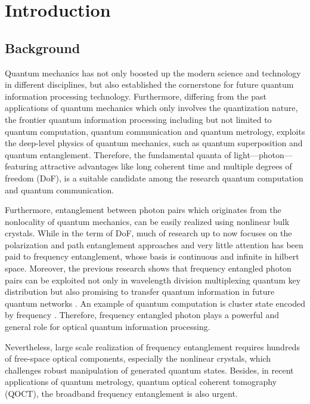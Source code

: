 \chapter{Introduction}

\section{Background}

Quantum mechanics has not only boosted up the modern science and technology in different disciplines, but also established the cornerstone for future quantum information processing technology. 
Furthermore, differing from the past applications of quantum mechanics which only involves the quantization nature, the frontier quantum information processing 
including but not limited to quantum computation, quantum communication and quantum metrology, 
exploits the deep-level physics of quantum mechanics, such as quantum superposition and quantum entanglement.
Therefore, the fundamental quanta of light---photon---featuring attractive advantages like long coherent time and multiple degrees of freedom (DoF), is a suitable candidate among the research quantum computation and quantum communication. 

Furthermore, entanglement between photon pairs which originates from the nonlocality of quantum mechanics, can be easily realized using nonlinear bulk crystals. 
While in the term of DoF, much of research up to now focuses on the polarization and path entanglement approaches and very little attention has been paid to frequency entanglement, whose basis is continuous and infinite in hilbert space. 
Moreover, the previous research shows that frequency entangled photon pairs can be exploited not only in wavelength division multiplexing quantum key distribution \cite{Wengerowsky2018} but also promising to transfer quantum information in future quantum networks \cite{Tchebotareva2019}. 
An example of quantum computation is cluster state encoded by frequency \cites{Reimer2019}.
Therefore, frequency entangled photon plays a powerful and general role for optical quantum information processing.

Nevertheless, large scale realization of frequency entanglement requires hundreds of free-space optical components, especially the nonlinear crystals, which challenges robust manipulation of generated quantum states.
Besides, in recent applications of quantum metrology, quantum optical coherent tomography (QOCT), the broadband frequency entanglement \cite{Okano2015} is also urgent.

